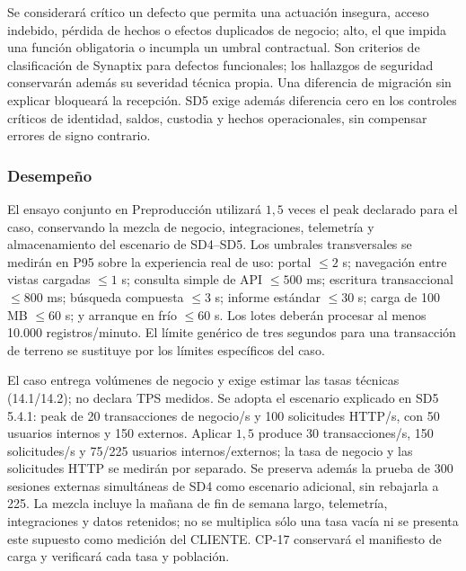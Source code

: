 Se considerará crítico un defecto que permita una actuación insegura, acceso indebido, pérdida de hechos o efectos duplicados de negocio; alto, el que impida una función obligatoria o incumpla un umbral contractual. Son criterios de clasificación de Synaptix para defectos funcionales; los hallazgos de seguridad conservarán además su severidad técnica propia. Una diferencia de migración sin explicar bloqueará la recepción. SD5 exige además diferencia cero en los controles críticos de identidad, saldos, custodia y hechos operacionales, sin compensar errores de signo contrario. \parencite[sec.~5.3, Ensayos y conciliación]{sd9-sd5}

\subsubsection{Desempeño}
El ensayo conjunto en Preproducción utilizará $1,5$ veces el peak declarado para el caso, conservando la mezcla de negocio, integraciones, telemetría y almacenamiento del escenario de SD4--SD5. Los umbrales transversales se medirán en P95 sobre la experiencia real de uso: portal $\leq2$ s; navegación entre vistas cargadas $\leq1$ s; consulta simple de API $\leq500$ ms; escritura transaccional $\leq800$ ms; búsqueda compuesta $\leq3$ s; informe estándar $\leq30$ s; carga de 100 MB $\leq60$ s; y arranque en frío $\leq60$ s. Los lotes deberán procesar al menos 10.000 registros/minuto. El límite genérico de tres segundos para una transacción de terreno se sustituye por los límites específicos del caso. \parencites[9.1, p.~21; 20.1, p.~34]{sd9-bt}[sec.~5.4]{sd9-sd5}

El caso entrega volúmenes de negocio y exige estimar las tasas técnicas (14.1/14.2); no declara TPS medidos. Se adopta el escenario explicado en SD5 5.4.1: peak de 20 transacciones de negocio/s y 100 solicitudes HTTP/s, con 50 usuarios internos y 150 externos. Aplicar $1,5$ produce 30 transacciones/s, 150 solicitudes/s y 75/225 usuarios internos/externos; la tasa de negocio y las solicitudes HTTP se medirán por separado. Se preserva además la prueba de 300 sesiones externas simultáneas de SD4 como escenario adicional, sin rebajarla a 225. La mezcla incluye la mañana de fin de semana largo, telemetría, integraciones y datos retenidos; no se multiplica sólo una tasa vacía ni se presenta este supuesto como medición del CLIENTE. CP-17 conservará el manifiesto de carga y verificará cada tasa y población. \parencites[sec.~14.1--14.2]{sd9-c07}[sec.~5.4.1]{sd9-sd5}[sec.~4.3]{sd9-sd4}

